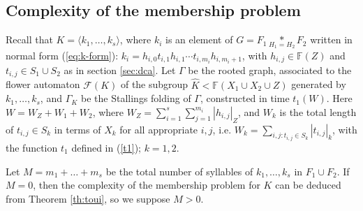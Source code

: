 \documentclass[a4paper,12pt]{article}
\newcommand{\G}{\Gamma }
\newcommand{\cF}{{\cal{F}}}
\numberwithin{equation}{section}
\numberwithin{figure}{section}
\newcommand{\FF}{\ensuremath{\mathbb{F}}}
\renewcommand{\cF}{\mathcal{F}}
\newcommand{\la}{\langle}
\newcommand{\ra}{\rangle}
\begin{document}
\subsection{Complexity of the membership problem}\label{sub:mp_complexity}

Recall that $K=\la k_1, \ldots , k_s\ra$, where $k_i$ is an element of $G = F_1 \underset{H_1=H_2}{\ast} F_2$
written in normal form (\ref{eq:k-form}): $k_i=
h_{i,0}t_{i,1}h_{i,1}\cdots t_{i,m_i}h_{i,m_i+1}$, with
$h_{i,j}\in \FF(Z)$ and $t_{i,j}\in S_1\cup S_2$ as in section
\ref{sec:dca}. Let $\G$ be the rooted graph, associated to
the flower automaton $\cF(K)$ of the subgroup $\hat K < \FF(X_1\cup
X_2 \cup Z)$ generated by $k_1, \ldots , k_s$, and $\G_K$ be the Stallings folding  of $\G$, constructed in time  $t_1(W)$.
Here $W = W_Z+W_1+W_2$,
 where $W_Z =
\mathop{\sum}\limits_{i=1}^{s}
\mathop{\sum}\limits_{j=1}^{m_i}|h_{i,j}|_Z$, and $W_k$ is the
total length of $t_{i,j} \in S_k$ in terms of $X_k$ for all
appropriate $i,j$, i.e. $W_k = \mathop{\sum}\limits_{i,j:
t_{i,j}\in S_k} |t_{i,j}|_k$, with the function $t_1$ defined in
(\ref{t1}); $k=1,2$.
 
Let $M = m_1+ \ldots + m_s$ be the total number of syllables of $k_1, \ldots, k_s$ in $F_1 \cup F_2$. If $M = 0$, then the complexity of the membership problem for $K$  can be deduced from Theorem \ref{th:toui}, so we suppose $M > 0$.
\end{document}
